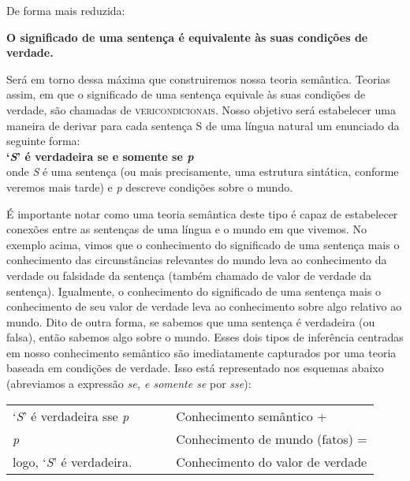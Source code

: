 \n De forma mais reduzida:\\


\begin{tcolorbox}[boxrule=0pt,sharp corners]
\noindent \textbf{O significado de uma sentença é equivalente às
suas condi\-çõ\-es de verdade.}
\end{tcolorbox}

\bigskip

\n Será em torno dessa máxima que construiremos nossa teoria
semântica. Teorias assim, em que o significado de uma sentença equivale às suas condições de verdade, são chamadas de \textsc{vericondicionais}. Nosso objetivo será estabelecer uma maneira de derivar
para cada sentença S de uma língua natural um enunciado da
seguinte forma:\\

\n \textbf{`\textit{S}' é verdadeira se e somente se
\textit{p}}\\

\noindent onde \textit{S} é uma sentença (ou mais
pre\-ci\-sa\-men\-te, uma estrutura sin\-tá\-ti\-ca, conforme
veremos mais tarde) e \textit{p} descreve condi\-çõ\-es sobre o
mundo.

É importante notar como uma teoria semântica deste tipo é capaz de
estabelecer conexões entre as sen\-ten\-ças de uma língua e o
mundo em que vivemos. No exemplo acima, vimos que o conhecimento
do significado de uma sentença mais o conhecimento das
circunstâncias relevantes do mundo leva ao conhecimento da verdade
ou falsidade da sentença (também chamado de valor de verdade da
sentença). Igualmente, o conhecimento do significado de uma
sentença mais o conhecimento de seu valor de verdade leva ao
conhecimento sobre algo relativo ao mundo. Dito de outra forma, se
sabemos que uma sentença é verdadeira (ou falsa), então sabemos
algo sobre o mundo. Esses dois tipos de inferência centradas em
nosso conhecimento semântico são imediatamente capturados por uma
teoria baseada em condi\-çõ\-es de verdade. Isso está representado
nos esquemas abaixo (abreviamos a expressão \textit{se, e somente
se} por \textit{sse}):\\

\n \begin{tabular}{l l l}

  `\textit{S}' é verdadeira sse \textit{p} & \ \ \  & Conhecimento semântico + \\

  \textit{p} & \ \ \  & Conhecimento de mundo (fatos) = \\
  logo, `\textit{S}' é verdadeira. & \ \ \  & Conhecimento do valor de verdade \\

\end{tabular}
\bigskip

